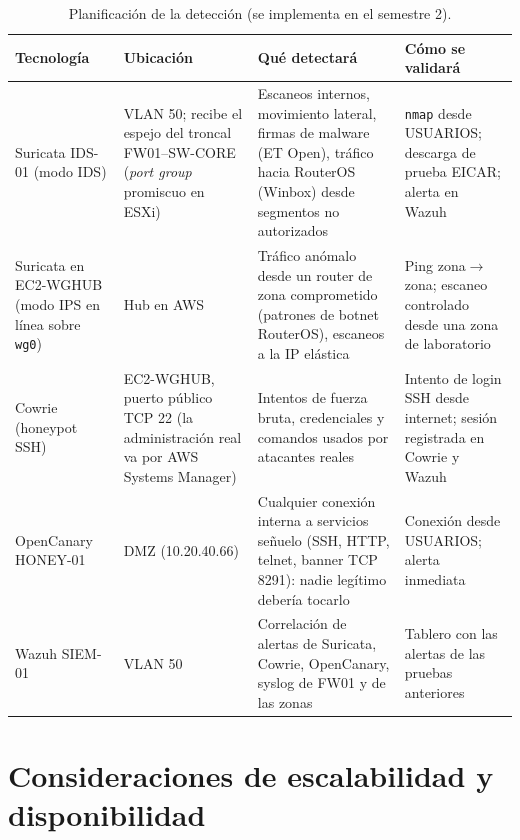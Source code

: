 \begin{table}[H]
\centering
\caption{Planificación de la detección (se implementa en el semestre 2).}
\label{tab:ce03-deteccion}
\small
\begin{tabularx}{\textwidth}{L{2.4cm}L{3.2cm}XL{3.6cm}}
\toprule
\textbf{Tecnología} & \textbf{Ubicación} & \textbf{Qué detectará} & \textbf{Cómo se validará} \\
\midrule
Suricata IDS-01 (modo IDS) & VLAN 50; recibe el espejo del troncal FW01--SW-CORE (\emph{port group} promiscuo en ESXi) & Escaneos internos, movimiento lateral, firmas de malware (ET Open), tráfico hacia RouterOS (Winbox) desde segmentos no autorizados & \texttt{nmap} desde USUARIOS; descarga de prueba EICAR; alerta en Wazuh \\
Suricata en EC2-WGHUB (modo IPS en línea sobre \texttt{wg0}) & Hub en AWS & Tráfico anómalo desde un router de zona comprometido (patrones de botnet RouterOS), escaneos a la IP elástica & Ping zona$\rightarrow$zona; escaneo controlado desde una zona de laboratorio \\
Cowrie (honeypot SSH) & EC2-WGHUB, puerto público TCP 22 (la administración real va por AWS Systems Manager) & Intentos de fuerza bruta, credenciales y comandos usados por atacantes reales & Intento de login SSH desde internet; sesión registrada en Cowrie y Wazuh \\
OpenCanary HONEY-01 & DMZ (10.20.40.66) & Cualquier conexión interna a servicios señuelo (SSH, HTTP, telnet, banner TCP 8291): nadie legítimo debería tocarlo & Conexión desde USUARIOS; alerta inmediata \\
Wazuh SIEM-01 & VLAN 50 & Correlación de alertas de Suricata, Cowrie, OpenCanary, syslog de FW01 y de las zonas & Tablero con las alertas de las pruebas anteriores \\
\bottomrule
\end{tabularx}
\end{table}

\section{Consideraciones de escalabilidad y disponibilidad}

